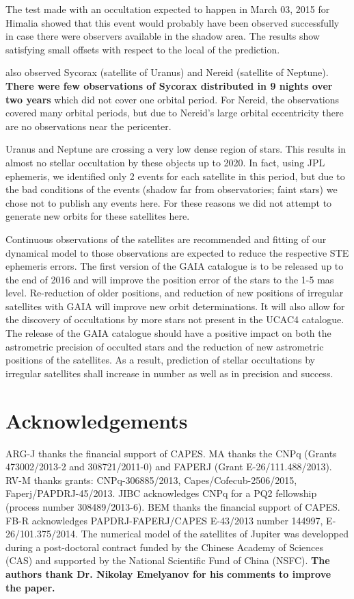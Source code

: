 \documentclass[useAMS,usenatbib]{mn2e}
\begin{document}
The test made with an occultation expected to happen in March 03, 2015 for Himalia showed that this event would probably have been observed successfully in case there were observers available in the shadow area. The results show satisfying small offsets with respect to the local of the prediction.

 also observed Sycorax (satellite of Uranus) and Nereid (satellite of Neptune). \textbf{There were few observations of Sycorax distributed in 9 nights over two years} which did not cover one orbital period. For Nereid, the observations covered many orbital periods, but due to Nereid's large orbital eccentricity there are no observations near the pericenter.

Uranus and Neptune are crossing a very low dense region of stars. This results in almost no stellar occultation by these objects up to 2020. In fact, using JPL ephemeris, we identified only 2 events for each satellite in this period, but due to the bad conditions of the events (shadow far from observatories; faint stars) we chose not to publish any events here.  For these reasons we did not attempt to generate new orbits for these satellites here.

Continuous observations of the satellites are recommended and fitting of our dynamical model to those observations are expected to reduce the respective STE ephemeris errors. The first version of the GAIA catalogue is to be released up to the end of 2016 and will improve the position error of the stars to the 1-5 mas level. Re-reduction of older positions, and reduction of new positions of irregular satellites with GAIA will improve new orbit determinations. It will also allow for the discovery of occultations by more stars not present in the UCAC4 catalogue.
The release of the GAIA catalogue should have a positive impact on both the astrometric precision of occulted stars and the reduction of new astrometric positions of the satellites. As a result, prediction of stellar occultations by irregular satellites shall increase in number as well as in precision and success.

\section*{Acknowledgements}

ARG-J thanks the financial support of CAPES.
MA thanks the CNPq (Grants 473002/2013-2 and 308721/2011-0) and FAPERJ (Grant E-26/111.488/2013).
RV-M thanks grants: CNPq-306885/2013, Capes/Cofecub-2506/2015, Faperj/PAPDRJ-45/2013.
JIBC acknowledges CNPq for a PQ2 fellowship (process number 308489/2013-6).
BEM thanks the financial support of CAPES.
FB-R acknowledges PAPDRJ-FAPERJ/CAPES E-43/2013 number 144997, E-26/101.375/2014.
The numerical model of the satellites of Jupiter was developped during a post-doctoral contract funded by the Chinese Academy of Sciences (CAS) and supported by the National Scientific Fund of China (NSFC). \textbf{The authors thank Dr. Nikolay Emelyanov for his comments to improve the paper.}






\label{lastpage}
\end{document}
